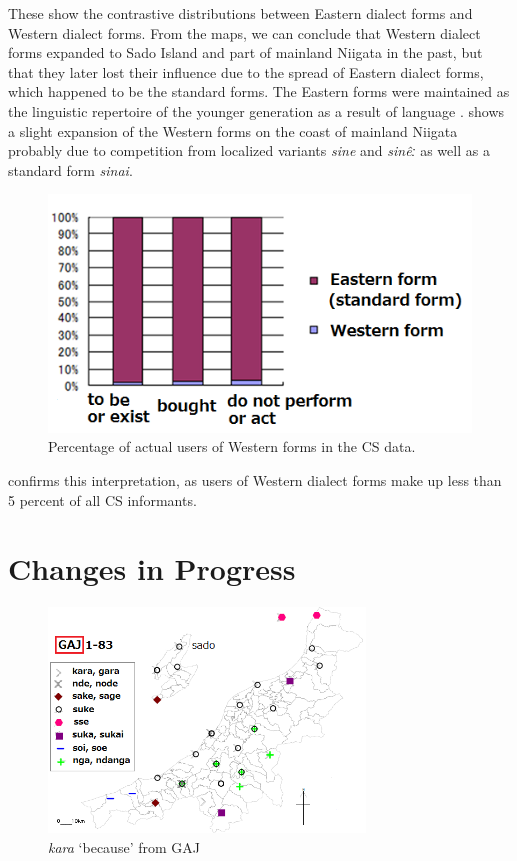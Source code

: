 \documentclass[output=paper]{LSP/langsci}
\begin{document}
These  show the contrastive distributions between Eastern dialect forms and Western dialect forms.  From the maps, we can conclude that Western dialect forms expanded to Sado Island and part of mainland Niigata in the past, but that they later lost their influence due to the spread of Eastern dialect forms, which happened to be the standard forms. The Eastern forms were maintained as the linguistic repertoire of the younger generation as a result of language .  shows a slight expansion of the Western forms on the coast of mainland Niigata probably due to  competition from localized variants \textit{sine} and \textit{sin\^{e}ː} as well as a standard form \textit{sinai}.  

\begin{figure}
\includegraphics[width=.75\textwidth]{illustrations/fuku2_fig3}
\caption{Percentage of actual users of Western forms in the \textsc{CS} data.}
\label{fig:fuku:3}
\end{figure}

 confirms this interpretation, as users of Western dialect forms make up less than 5 percent of all \textsc{CS} informants.

\section{Changes in Progress}

\begin{figure}
\includegraphics[width=0.75\textwidth]{illustrations/fuku2_fig4a}
\caption{\textit{kara} `because' from GAJ}
\label{fig:fuku:4a}
\end{figure}
\end{document}
